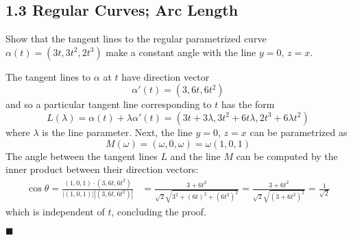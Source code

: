 \documentclass[12pt]{article}
\renewcommand{\qed}{\hfill$\blacksquare$}
\renewenvironment{proof}{\begin{addmargin}[1em]{0em}\begin{newproof}}{\end{newproof}\end{addmargin}\qed}
\newenvironment{problem}[2][Exercise]{\begin{trivlist}
\item[\hskip \labelsep {\bfseries #1}\hskip \labelsep {\bfseries #2.}]}{\end{trivlist}}
\begin{document}
\subsection*{1.3 Regular Curves; Arc Length}

\begin{problem}{1.3.1}
Show that the tangent lines to the regular parametrized curve $\alpha\left(t\right)=\left(3t,3t^2,2t^3\right)$ make a constant angle with the line $y=0$, $z=x$.
\end{problem}
\begin{proof}
The tangent lines to $\alpha$ at $t$ have direction vector \[ \alpha'\left(t\right) = \left(3, 6t, 6t^2\right) \] and so a particular tangent line corresponding to $t$ has the form \[ L\left(\lambda\right) = \alpha\left(t\right) + \lambda \alpha'\left(t\right) = \left( 3t+3\lambda, 3t^2+6t\lambda ,  2t^3+ 6\lambda t^2 \right) \] where $\lambda $ is the line parameter. Next, the line $y=0$, $z=x$ can be parametrized as \[ M\left(\omega\right) = \left( \omega, 0, \omega\right) = \omega \left(1,0,1\right) \] The angle between the tangent lines $L$ and the line $M$ can be computed by the inner product between their direction vectors: 
\begin{align*}
	\cos\theta =\frac{\left(1,0,1\right) \cdot \left( 3,6t,6t^2\right)}{ \left| \left(1,0,1\right) \right| \left|\left(3,6t,6t^2\right)\right| }  & = \frac{3+6t^2}{\sqrt{2} \sqrt{3^2 + \left(6t\right)^2 + \left(6t^2\right)^2 } }= \frac{3+6t^2}{\sqrt{2} \sqrt{\left(3+6t^2\right)^2} }  = \frac{1}{\sqrt{2}}
\end{align*} which is independent of $t$, concluding the proof.
\end{proof}
\end{document}
